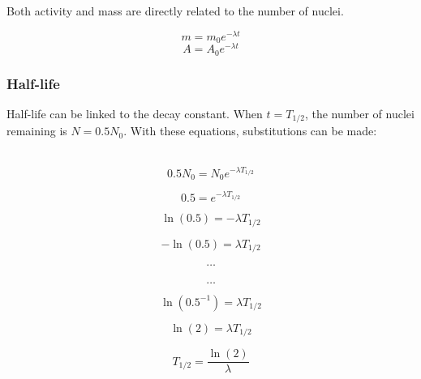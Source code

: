 \documentclass[12pt]{article}
\begin{document}
Both activity and mass are directly related to the number of nuclei.

\[m = m_0 e^{- \lambda t}\]
\[A = A_0 e^{- \lambda t}\]

\subsubsection{Half-life}
\label{sec:org94d8073}

Half-life can be linked to the decay constant. When \(t= T_{1/2}\), the number of nuclei remaining is \(N = 0.5N_0\). With these equations, substitutions can be made:


\begin{figure}[H]
\centering
\begin{minipage}{0.8\textwidth}
\begin{tcolorbox}[
sharp corners=all,
colback=white,
colframe=white,
size=tight,
boxrule=0.2mm,
left=10mm, right=10mm,
]
\begin{multicols}{2}
\noindent
\\
\[0.5N_0 = N_0 e^{-\lambda T_{1/2}}\]

\[0.5 = e^{-\lambda T_{1/2}}\]

\[\ln (0.5) = -\lambda T_{1/2}\]

\[-\ln (0.5) = \lambda T_{1/2}\]

\[\textbf{\ldots}\]
\columnbreak
\\
\[\textbf{\ldots}\]

\[\ln (0.5^{-1}) = \lambda T_{1/2}\]

\[\ln (2) = \lambda T_{1/2}\]

\[T_{1/2} = \dfrac{\ln(2)}{\lambda}\]
\\
\\
\end{multicols}
\end{tcolorbox}
\end{minipage}
\end{figure}
\end{document}
